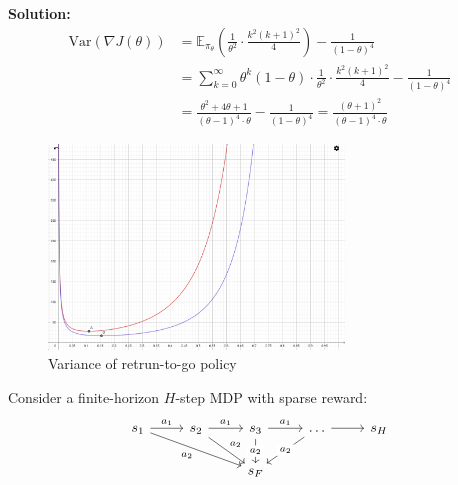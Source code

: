 \documentclass{article}
\begin{document}
\begin{enumerate}
\begin{enumerate}
    \textbf{Solution:}
    $$
    \begin{aligned}
    \text{Var}(\nabla J(\theta)) &= \mathbb{E}_{\pi_{\theta}} \left( \frac{1}{\theta^2} \cdot \frac{k^2 (k+1)^2}{4} \right) - \frac{1}{(1-\theta)^4} \\
    &= \sum_{k=0}^{\infty} \theta^k (1-\theta) \cdot \frac{1}{\theta^2} \cdot \frac{k^2 (k+1)^2}{4} - \frac{1}{(1-\theta)^4} \\
    &= \frac{\theta^2 + 4\theta + 1}{(\theta-1)^4 \cdot \theta} - \frac{1}{(1-\theta)^4} = \frac{(\theta+1)^2}{(\theta-1)^4 \cdot \theta}
    \end{aligned}
    $$

    \begin{figure}[H]
    \centering
    \includegraphics[width=0.7\textwidth]{img/PG_rtg_variance.jpg}
    \caption{Variance of retrun-to-go policy}
    \label{fig:PG_rtg_variance}
    \end{figure}

\end{enumerate}
\newpage
{} Consider a finite-horizon $H$-step MDP with sparse reward:
\[\begin{tikzcd}
	{s_1} & {s_2} & {s_3} & \dots & {s_H} \\
	&& {s_F}
	\arrow["{a_1}", from=1-1, to=1-2]
	\arrow["{a_1}", from=1-2, to=1-3]
	\arrow["{a_2}"', from=1-1, to=2-3]
	\arrow["{a_1}", from=1-3, to=1-4]
	\arrow[from=1-4, to=1-5]
	\arrow["{a_2}", from=1-2, to=2-3]
	\arrow["{a_2}"{description}, from=1-3, to=2-3]
	\arrow["{a_2}"{description}, from=1-4, to=2-3]
\end{tikzcd}\]


\end{enumerate}
\end{document}

